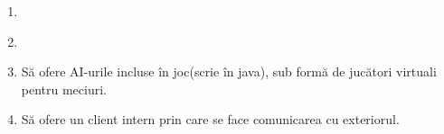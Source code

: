 \documentclass{article}
\begin{document}
\begin{enumerate}
\begin{enumerate}
           \item Să primească și să execute comenzile de stare de la Manager. (buclă)

           \item Să primească și să execute comenzile de jucat de la agenți. (buclă)

           \item Să transmită agenților noul gamestate de fiecare dată când se modifică. (buclă)

        \end{enumerate}

    \item \textbf{ \color{red}{Să ofere un vizualizator pentru a vedea meciul în timp real.} }

    \item \textbf{ \color{red}{Să ofere funcționalitate de Map Editor - creare hărți noi, modificare hărți existente.} }

    \item Să ofere AI-urile incluse în joc(scrie în java), sub formă de jucători virtuali pentru meciuri.

    \item Să ofere un client intern prin care se face comunicarea cu exteriorul.
\end{enumerate}
\end{document}
